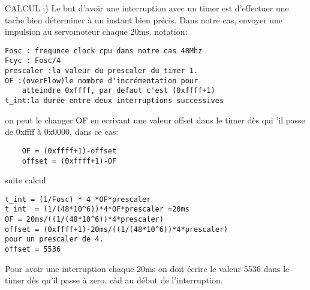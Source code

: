 \documentclass[french]{beamer}
\newcommand\justifyit{\rightskip0pt \leftskip0pt}
\begin{document}
\begin{frame}[fragile]{CALCUL :)}
\justifyit
Le but d'avoir une interruption avec un timer est d'effectuer une tache bien déterminer à un instant bien précis.
Dans notre cas, envoyer une impulsion au servomoteur chaque 20ms.
notation:
\begin{verbatim}
Fosc : frequnce clock cpu dans notre cas 48Mhz
Fcyc : Fosc/4
prescaler :la valeur du prescaler du timer 1.
OF :(overFlow)le nombre d'incrémentation pour
    atteindre 0xffff, par defaut c'est (0xffff+1)
t_int:la durée entre deux interruptions successives
\end{verbatim}
on peut le changer OF en ecrivant une valeur offset dans le timer dès qui 'il passe de 0xffff
à 0x0000, dans ce cas: 
    \begin{verbatim}
    OF = (0xffff+1)-offset 
    offset = (0xffff+1)-OF
    \end{verbatim}
 
\end{frame}

\begin{frame}[fragile]{suite calcul}
\justifyit
   \begin{verbatim}
t_int = (1/Fosc) * 4 *OF*prescaler
t_int  = (1/(48*10^6))*4*OF*prescaler =20ms
OF = 20ms/((1/(48*10^6))*4*prescaler)
offset = (0xffff+1)-20ms/((1/(48*10^6))*4*prescaler)
pour un prescaler de 4.
offset = 5536
    \end{verbatim}
    Pour avoir une interruption chaque 20ms on doit écrire le valeur 5536 dans le timer dès qu'il passe à zero.
    càd au début de l'interruption.

\end{frame}

\begin{frame}[fragile]{}


\raggedright
    \nocite{*}
    
    


\end{frame}


\end{document}
